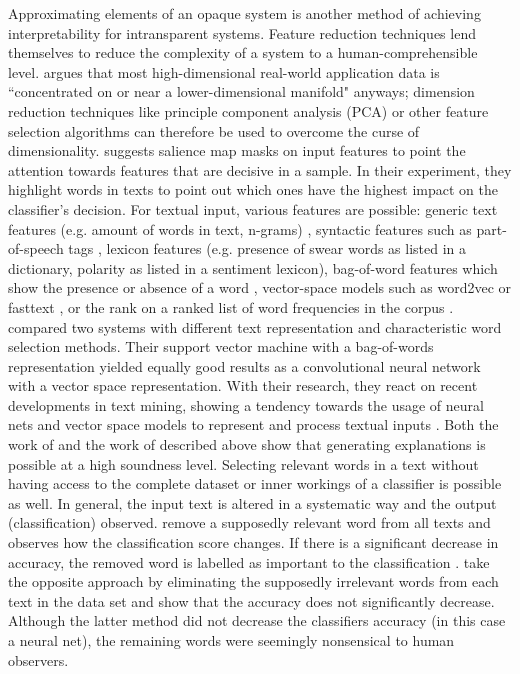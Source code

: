 Approximating elements of an opaque system is another method of achieving interpretability for intransparent systems. Feature reduction techniques lend themselves to reduce the complexity of a system to a human-comprehensible level. \cite{domingos2012few} argues that most high-dimensional real-world application data is ``concentrated on or near a lower-dimensional manifold" anyways; dimension reduction techniques like principle component analysis (PCA) or other feature selection algorithms can therefore be used to overcome the curse of dimensionality. \cite{chen2018learning} suggests salience map masks on input features to point the attention towards features that are decisive in a sample. In their experiment, they highlight words in texts to point out which ones have the highest impact on the classifier's decision. For textual input, various features are possible: generic text features (e.g. amount of words in text, n-grams) \cite{del2017hate}, syntactic features such as part-of-speech tags \cite{del2017hate}, lexicon features (e.g. presence of swear words as listed in a dictionary, polarity as listed in a sentiment lexicon), bag-of-word features which show the presence or absence of a word \cite{arras2017relevant}, vector-space models such as word2vec or fasttext \cite{arras2017relevant, hovelmann2017fasttext}, or the rank on a ranked list of word frequencies in the corpus \cite{chen2018learning}. \cite{arras2017relevant} compared two systems with different text representation and characteristic word selection methods. Their support vector machine with a bag-of-words representation yielded equally good results as a convolutional neural network with a vector space representation. With their research, they react on recent developments in text mining, showing a tendency towards the usage of neural nets and vector space models to represent and process textual inputs \cite{arras2017relevant}. Both the work of \cite{arras2017relevant} and the work of \cite{chen2018learning} described above show that generating explanations is possible at a high soundness level. Selecting relevant words in a text without having access to the complete dataset or inner workings of a classifier is possible as well. In general, the input text is altered in a systematic way and the output (classification) observed. \cite{arras2017relevant} remove a supposedly relevant word from all texts and observes how the classification score changes. If there is a significant decrease in accuracy, the removed word is labelled as important to the classification \cite{arras2017relevant}. \cite{feng2018pathologies} take the opposite approach by eliminating the supposedly irrelevant words from each text in the data set and show that the accuracy does not significantly decrease. Although the latter method did not decrease the classifiers accuracy (in this case a neural net), the remaining words were seemingly nonsensical to human observers.\newline
